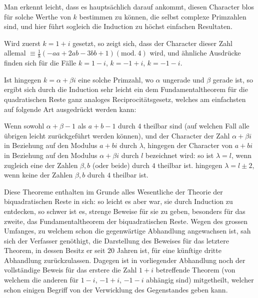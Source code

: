 Man erkennt leicht, dass es hauptsächlich darauf ankommt, diesen Character blos für solche Werthe von $k$ bestimmen zu können, die selbst complexe Primzahlen sind, und hier führt sogleich die Induction zu höchst einfachen Resultaten.

Wird zuerst $k=1+i$ gesetzt, so zeigt sich, dass der Character dieser Zahl allemal $\equiv\frac18(-aa+2ab-3bb+1)(\mathrm{mod.}\ 4)$ wird, und ähnliche Ausdrücke finden sich für die Fälle $k=1-i$, $k=-1+i$, $k=-1-i$.

Ist hingegen $k=\alpha+\beta i$ eine solche Primzahl, wo $\alpha$ ungerade und $\beta$ gerade ist, so ergibt sich durch die Induction sehr leicht ein dem Fundamentaltheorem für die quadratischen Reste ganz analoges Reciprocitätsgesetz, welches am einfachsten auf folgende Art ausgedrückt werden kann:

Wenn sowohl $\alpha+\beta-1$ als $a+b-1$ durch $4$ theilbar sind (auf welchen Fall alle übrigen leicht zurückgeführt werden können), und der Character der Zahl $\alpha+\beta i$ in Beziehung auf den Modulus $a+bi$ durch $\lambda$, hingegen der Character von $a+bi$ in Beziehung auf den Modulus $\alpha+\beta i$ durch $l$ bezeichnet wird: so ist $\lambda=l$, wenn zugleich eine der Zahlen $\beta,b$ (oder beide) durch $4$ theilbar ist. hingegen $\lambda=l\pm2$, wenn keine der Zahlen $\beta,b$ durch $4$ theilbar ist.

Diese Theoreme enthalten im Grunde alles Wesentliche der Theorie der biquadratischen Reste in sich: so leicht es aber war, sie durch Induction zu entdecken, so schwer ist es, strenge Beweise für sie zu geben, besonders für das zweite, das Fundamentaltheorem der biquadratischen Reste. Wegen des grossen Umfanges, zu welchem schon die gegenwärtige Abhandlung angewachsen ist, sah sich der Verfasser genöthigt, die Darstellung des Beweises für das letztere Theorem, in dessen Besitz er seit $20$ Jahren ist, für eine künftige dritte Abhandlung zurückzulassen. Dagegen ist in vorliegender Abhandlung noch der vollständige Beweis für das erstere die Zahl $1+i$ betreffende Theorem (von welchem die 
%
anderen für $1-i$, $-1+i$, $-1-i$ abhängig sind) mitgetheilt, welcher schon einigen Begriff von der Verwicklung des Gegenstandes geben kann.

